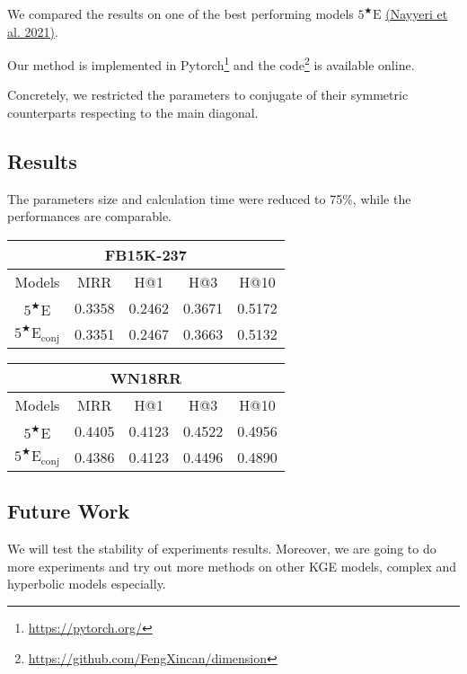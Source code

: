 \documentclass[9pt]{ctexart}
\theoremstyle{definition}
\begin{document}
We compared the results on one of the best performing models $5^{\bigstar}\mathrm{E}$ 
\hyperlink{Nay21}{(Nayyeri et al. 2021)}.

Our method is implemented in Pytorch\footnote{\url{https://pytorch.org/}} and the code\footnote{\url{https://github.com/FengXincan/dimension}} is available online.

Concretely, we restricted the parameters to conjugate of their symmetric counterparts respecting to the main diagonal.

\subsection{Results}
The parameters size and calculation time were reduced to 75\%, while the performances are comparable.

\begin{center}
\begin{tabular}{ccccc}
    \toprule
    \multicolumn{5}{c}{FB15K-237}\\
    \hline
    Models & MRR & H@1 & H@3 & H@10 \\
    \midrule
    $5^{\bigstar}\mathrm{E}$ & 0.3358 & 0.2462 & 0.3671 & 0.5172 \\
    $5^{\bigstar}\mathrm{E_{conj}}$ & 0.3351 & 0.2467 & 0.3663 & 0.5132 \\
    \bottomrule
\end{tabular}

\bigskip

\begin{tabular}{ccccc}
    \toprule
    \multicolumn{5}{c}{WN18RR}\\
    \hline
    Models & MRR & H@1 & H@3 & H@10 \\
    \midrule
    $5^{\bigstar}\mathrm{E}$ & 0.4405 & 0.4123 & 0.4522 & 0.4956\\
    $5^{\bigstar}\mathrm{E_{conj}}$ & 0.4386 & 0.4123 & 0.4496 & 0.4890\\
    \bottomrule
\end{tabular}
\end{center}

\subsection{Future Work}
We will test the stability of experiments results. 
Moreover, we are going to do more experiments and try out more methods on other KGE models, complex and hyperbolic models especially.
\end{document}
